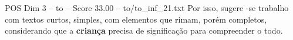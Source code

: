 \begin{textsample}{POS Dim 3 – to – Score 33.00 – to/to\_inf\_21.txt}
Por isso, sugere -se trabalho com textos curtos, simples, com elementos que rimam, porém completos, considerando que a \textbf{criança} precisa de significação para compreender o todo.

\end{textsample}
